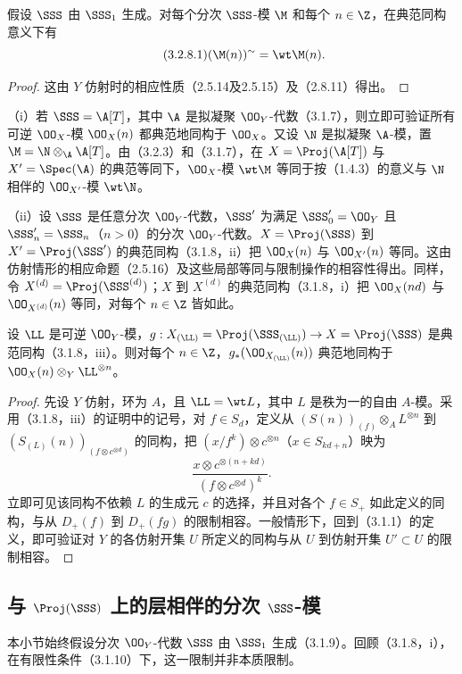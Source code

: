 假设 $\SSS$ 由 $\SSS_1$ 生成。对每个分次 $\SSS$-模 $\M$ 和每个 $n\in\Z$，在典范同构意义下有
\begin{equation}\tag{3.2.8.1}(\M(n))^\sim=\wt\M(n).\end{equation}
\begin{proof}
这由 $Y$ 仿射时的相应性质（2.5.14及2.5.15）及（2.8.11）得出。
\end{proof}

（i）若 $\SSS=\A[T]$，其中 $\A$ 是拟凝聚 $\OO_Y$-代数（3.1.7），则立即可验证所有可逆 $\OO_X$-模 $\OO_X(n)$ 都典范地同构于 $\OO_X$。又设 $\N$ 是拟凝聚 $\A$-模，置 $\M=\N\otimes_{\A}\A[T]$。由（3.2.3）和（3.1.7），在 $X=\Proj(\A[T])$ 与 $X'=\Spec(\A)$ 的典范等同下，$\OO_X$-模 $\wt\M$ 等同于按（1.4.3）的意义与 $\N$ 相伴的 $\OO_{X'}$-模 $\wt\N$。

（ii）设 $\SSS$ 是任意分次 $\OO_Y$-代数，$\SSS'$ 为满足 $\SSS'_0=\OO_Y$ 且 $\SSS'_n=\SSS_n$（$n>0$）的分次 $\OO_Y$-代数。$X=\Proj(\SSS)$ 到 $X'=\Proj(\SSS')$ 的典范同构（3.1.8，ii）把 $\OO_X(n)$ 与 $\OO_{X'}(n)$ 等同。这由仿射情形的相应命题（2.5.16）及这些局部等同与限制操作的相容性得出。同样，令 $X^{(d)}=\Proj(\SSS^{(d)})$；$X$ 到 $X^{(d)}$ 的典范同构（3.1.8，i）把 $\OO_X(nd)$ 与 $\OO_{X^{(d)}}(n)$ 等同，对每个 $n\in\Z$ 皆如此。

设 $\LL$ 是可逆 $\OO_Y$-模，$g:X_{(\LL)}=\Proj(\SSS_{(\LL)})\to X=\Proj(\SSS)$ 是典范同构（3.1.8，iii）。则对每个 $n\in\Z$，$g_*(\OO_{X_{(\LL)}}(n))$ 典范地同构于 $\OO_X(n)\otimes_Y\LL^{\otimes n}$。
\begin{proof}
先设 $Y$ 仿射，环为 $A$，且 $\LL=\wt L$，其中 $L$ 是秩为一的自由 $A$-模。采用（3.1.8，iii）的证明中的记号，对 $f\in S_d$，定义从
$(S(n))_{(f)}\otimes_A L^{\otimes n}$ 到 $(S_{(L)}(n))_{(f\otimes c^{\otimes d})}$ 的同构，把 $(x/f^k)\otimes c^{\otimes n}$（$x\in S_{kd+n}$）映为
\[
\frac{x\otimes c^{\otimes(n+kd)}}{(f\otimes c^{\otimes d})^k}.
\]
立即可见该同构不依赖 $L$ 的生成元 $c$ 的选择，并且对各个 $f\in S_+$ 如此定义的同构，与从 $D_+(f)$ 到 $D_+(fg)$ 的限制相容。一般情形下，回到（3.1.1）的定义，即可验证对 $Y$ 的各仿射开集 $U$ 所定义的同构与从 $U$ 到仿射开集 $U'\subset U$ 的限制相容。
\end{proof}

\subsection{与 \texorpdfstring{$\Proj(\SSS)$}{Proj(S)} 上的层相伴的分次 \texorpdfstring{$\SSS$}{S}-模}
本小节始终假设分次 $\OO_Y$-代数 $\SSS$ 由 $\SSS_1$ 生成（3.1.9）。回顾（3.1.8，i），在有限性条件（3.1.10）下，这一限制并非本质限制。

